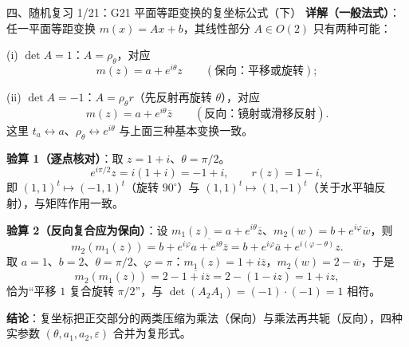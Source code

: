 \documentclass[aspectratio=169,10pt,fontset=none]{ctexbeamer}
\newcommand{\key}[1]{\textcolor{ink}{\bfseries #1}}
\begin{document}
\begin{frame}[t]{四、随机复习 1/21：G21 平面等距变换的复坐标公式（下）}
\scriptsize
\key{详解（一般法式）}：任一平面等距变换 $m(x)=Ax+b$，其线性部分 $A\in O(2)$ 只有两种可能：

(i) $\det A=1$：$A=\rho_\theta$，对应
\[ m(z)=a+e^{i\theta}z\qquad(\text{保向：平移或旋转}); \]

(ii) $\det A=-1$：$A=\rho_\theta r$（先反射再旋转 $\theta$），对应
\[ m(z)=a+e^{i\theta}\overline z\qquad(\text{反向：镜射或滑移反射}). \]
这里 $t_a\leftrightarrow a$、$\rho_\theta\leftrightarrow e^{i\theta}$ 与上面三种基本变换一致。

\key{验算 1（逐点核对）}：取 $z=1+i$、$\theta=\pi/2$。
\[ e^{i\pi/2}z=i(1+i)=-1+i,\qquad r(z)=1-i, \]
即 $(1,1)^t\mapsto(-1,1)^t$（旋转 $90^\circ$）与 $(1,1)^t\mapsto(1,-1)^t$（关于水平轴反射），与矩阵作用一致。

\key{验算 2（反向复合应为保向）}：设 $m_1(z)=a+e^{i\theta}\overline z$、$m_2(w)=b+e^{i\varphi}\overline w$，则
\[ m_2(m_1(z))=b+e^{i\varphi}\overline{a+e^{i\theta}\overline z}=b+e^{i\varphi}\overline a+e^{i(\varphi-\theta)}z. \]
取 $a=1$、$b=2$、$\theta=\pi/2$、$\varphi=\pi$：$m_1(z)=1+i\overline z$，$m_2(w)=2-\overline w$，于是
\[ m_2(m_1(z))=2-\overline{1+i\overline z}=2-(1-iz)=1+iz, \]
恰为“平移 $1$ 复合旋转 $\pi/2$”，与 $\det(A_2A_1)=(-1)\cdot(-1)=1$ 相符。

\key{结论}：复坐标把正交部分的两类压缩为乘法（保向）与乘法再共轭（反向），四种实参数 $(\theta,a_1,a_2,\varepsilon)$ 合并为复形式。
\end{frame}
\end{document}
